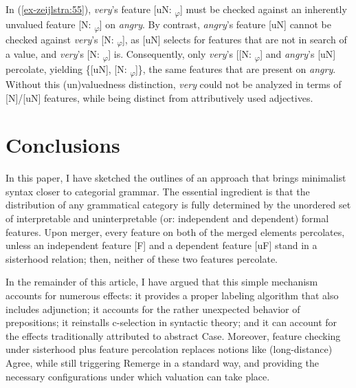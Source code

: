 \documentclass[output=paper
,modfonts
,nonflat]{langsci/langscibook}
\begin{document}
\begin{figure}[!h]
\begin{exe}
\end{exe} \vspace{-0.9cm}
\end{figure}
\newpage\noindent In (\ref{ex-zeijlstra:55}), \textit{very}’s feature [uN: \ul{}\textsubscript{$\varphi$}] must be checked against an inherently unvalued feature [N: \ul{}\textsubscript{$\varphi$}] on \textit{angry}. By contrast, \textit{angry}’s feature [uN] cannot be checked against \textit{very}’s [N: \ul{}\textsubscript{$\varphi$}], as [uN] selects for features that are not in search of a value, and \textit{very}’s [N: \ul{}\textsubscript{$\varphi$}] is. Consequently, only \textit{very}’s [[N: \ul{}\textsubscript{$\varphi$}] and \textit{angry}’s [uN] percolate, yielding \{[uN], [N: \ul{}\textsubscript{$\varphi$}]\}, the same features that are present on \textit{angry}. Without this (un)valuedness distinction, \textit{very} could not be analyzed in terms of [N]/[uN] features, while being distinct from attributively used adjectives.

\section{Conclusions}
In this paper, I have sketched the outlines of an approach that brings minimalist syntax closer to categorial grammar. The essential ingredient is that the distribution of any grammatical category is fully determined by the unordered set of interpretable and uninterpretable (or: independent and dependent) formal features. Upon merger, every feature on both of the merged elements percolates, unless an independent feature {[}F{]} and a dependent feature {[}uF{]} stand in a sisterhood relation; then, neither of these two features percolate.

In the remainder of this article, I have argued that this simple mechanism accounts for numerous effects: it provides a proper labeling algorithm that also includes adjunction; it accounts for the rather unexpected behavior of prepositions; it reinstalls c-selection in syntactic theory; and it can account for the effects traditionally attributed to abstract Case. Moreover, feature checking under sisterhood plus feature percolation replaces notions like (long-distance) Agree, while still triggering Remerge in a standard way, and providing the necessary configurations under which valuation can take place.
\end{document}
